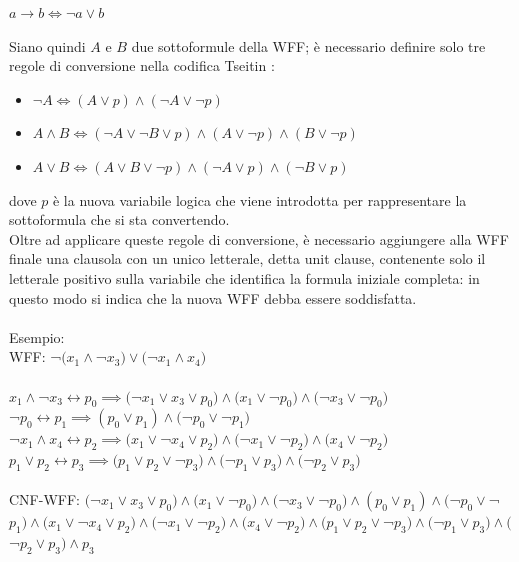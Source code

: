\begin{center}
    $a \rightarrow b \iff \lnot a \lor b$
\end{center}
Siano quindi $A$ e $B$ due sottoformule della WFF; è necessario definire solo 
tre regole di conversione nella codifica Tseitin \cite{tseitin-rules}:
\begin{itemize}
    \item $\lnot A \iff (A \lor p) \land (\lnot A \lor \lnot p)$
    \item $A \land B \iff (\lnot A \lor \lnot B \lor p) \land (A \lor \lnot p) \land (B \lor \lnot p)$
    \item $A \lor B \iff (A \lor B \lor \lnot p) \land (\lnot A \lor p) \land (\lnot B \lor p)$
\end{itemize}
dove $p$ è la nuova variabile logica che viene introdotta per rappresentare la sottoformula che si sta convertendo.\\
Oltre ad applicare queste regole di conversione, è necessario aggiungere alla WFF finale 
una clausola con un unico letterale, detta unit clause, contenente solo il letterale positivo sulla variabile che identifica la formula iniziale completa: in questo modo si indica che la nuova WFF debba essere soddisfatta.\\
\\
Esempio:\\
WFF: ¬$(x_1 \land $¬$x_3) \lor ($¬$x_1 \land x_4)$\\
\\
$x_1 \land $¬$x_3 \leftrightarrow p_0 \implies ($¬$x_1 \lor x_3 \lor p_0) \land (x_1 \lor $¬$p_0) \land ($¬$x_3 \lor $¬$p_0)$\\
¬$p_0 \leftrightarrow p_1 \implies (p_0 \lor p_1) \land ($¬$p_0 \lor $¬$p_1)$\\
¬$x_1 \land x_4 \leftrightarrow p_2 \implies (x_1 \lor $¬$x_4 \lor p_2) \land ($¬$x_1 \lor $¬$p_2) \land (x_4 \lor $¬$p_2)$\\
$p_1 \lor p_2 \leftrightarrow p_3 \implies (p_1 \lor p_2 \lor $¬$p_3) \land ($¬$p_1 \lor p_3) \land ($¬$p_2 \lor p_3)$\\
\\
CNF-WFF: $($¬$x_1 \lor x_3 \lor p_0) \land (x_1 \lor $¬$p_0) \land ($¬$x_3 \lor $¬$p_0) \land (p_0 \lor p_1) \land ($¬$p_0 \lor $¬$p_1) \land (x_1 \lor $¬$x_4 \lor p_2) \land ($¬$x_1 \lor $¬$p_2) \land (x_4 \lor $¬$p_2) \land (p_1 \lor p_2 \lor $¬$p_3) \land ($¬$p_1 \lor p_3) \land ($¬$p_2 \lor p_3) \land p_3$\\


